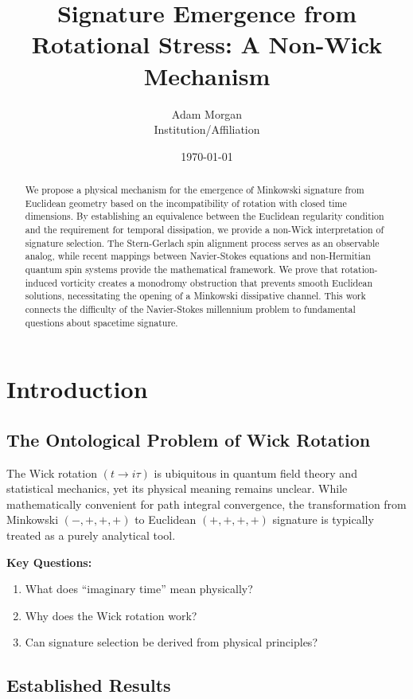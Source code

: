 \documentclass[11pt]{article}
\title{Signature Emergence from Rotational Stress: A Non-Wick Mechanism}
\author{Adam Morgan\\
\small Institution/Affiliation}
\date{\today}
\begin{document}
\maketitle

\begin{abstract}
We propose a physical mechanism for the emergence of Minkowski signature from Euclidean geometry based on the incompatibility of rotation with closed time dimensions. By establishing an equivalence between the Euclidean regularity condition and the requirement for temporal dissipation, we provide a non-Wick interpretation of signature selection. The Stern-Gerlach spin alignment process serves as an observable analog, while recent mappings between Navier-Stokes equations and non-Hermitian quantum spin systems provide the mathematical framework. We prove that rotation-induced vorticity creates a monodromy obstruction that prevents smooth Euclidean solutions, necessitating the opening of a Minkowski dissipative channel. This work connects the difficulty of the Navier-Stokes millennium problem to fundamental questions about spacetime signature.
\end{abstract}

\section{Introduction}

\subsection{The Ontological Problem of Wick Rotation}

The Wick rotation $(t \to i\tau)$ is ubiquitous in quantum field theory and statistical mechanics, yet its physical meaning remains unclear. While mathematically convenient for path integral convergence, the transformation from Minkowski $(-,+,+,+)$ to Euclidean $(+,+,+,+)$ signature is typically treated as a purely analytical tool.

\textbf{Key Questions:}
\begin{enumerate}
\item What does ``imaginary time'' mean physically?
\item Why does the Wick rotation work?
\item Can signature selection be derived from physical principles?
\end{enumerate}

\subsection{Established Results}
\end{document}
